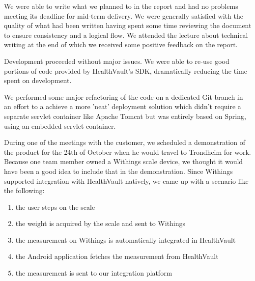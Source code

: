 We were able to write what we planned to in the report and had no problems meeting its deadline for
mid-term delivery. We were generally satisfied with the quality of what had
been written having spent some time reviewing the document to ensure consistency and a logical flow.
We attended the lecture about technical writing at the end of which we received some positive
feedback on the report.%

Development proceeded without major issues. We were able to re-use good portions of code provided
by HealthVault's SDK, dramatically reducing the time spent on development. %

We performed some major refactoring of the code on a dedicated Git branch in an effort
to a achieve a more 'neat' deployment solution which didn't require a separate servlet container like
Apache Tomcat but was entirely based on Spring, using an embedded servlet-container.

During one of the meetings with the customer, we scheduled a demonstration of the product
for the 24th of October when he would travel to Trondheim for work.
Because one team member owned a Withings scale device, we thought it would have been
a good idea to include that in the demonstration.
Since Withings supported integration with HealthVault natively, we came up with a scenario
like the following:
\begin{enumerate}[1)]
\item the user steps on the scale
\item the weight is acquired by the scale and sent to Withings
\item the measurement on Withings is automatically integrated in HealthVault
\item the Android application fetches the measurement from HealthVault
\item the measurement is sent to our integration platform
\end{enumerate}


